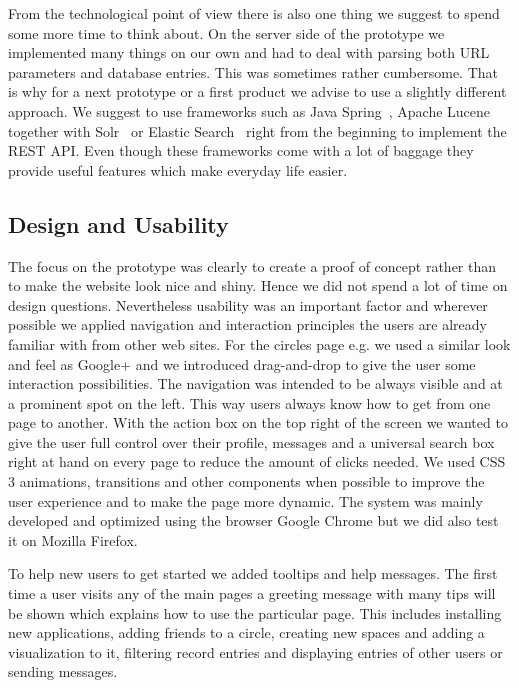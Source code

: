 From the technological point of view there is also one thing we suggest to spend some more time to think about. On the server side of the prototype we implemented many things on our own and had to deal with parsing both URL parameters and database entries. This was sometimes rather cumbersome. That is why for a next prototype or a first product we advise to use a slightly different approach. We suggest to use frameworks such as Java Spring~\cite{spring}, Apache Lucene together with Solr~\cite{lucene} or Elastic Search~\cite{elasticsearch} right from the beginning to implement the REST API. Even though these frameworks come with a lot of baggage they provide useful features which make everyday life easier.

\subsection{Design and Usability}

The focus on the prototype was clearly to create a proof of concept rather than to make the website look nice and shiny. Hence we did not spend a lot of time on design questions. Nevertheless usability was an important factor and wherever possible we applied navigation and interaction principles the users are already familiar with from other web sites. For the circles page e.g. we used a similar look and feel as Google+ and we introduced drag-and-drop to give the user some interaction possibilities. The navigation was intended to be always visible and at a prominent spot on the left. This way users always know how to get from one page to another. With the action box on the top right of the screen we wanted to give the user full control over their profile, messages and a universal search box right at hand on every page to reduce the amount of clicks needed. We used CSS 3 animations, transitions and other components when possible to improve the user experience and to make the page more dynamic. The system was mainly developed and optimized using the browser Google Chrome but we did also test it on Mozilla Firefox. 

To help new users to get started we added tooltips and help messages. The first time a user visits any of the main pages a greeting message with many tips will be shown which explains how to use the particular page. This includes installing new applications, adding friends to a circle, creating new spaces and adding a visualization to it, filtering record entries and displaying entries of other users or sending messages.



